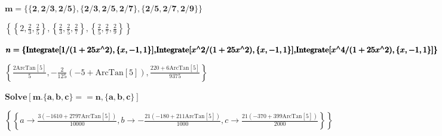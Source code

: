 \documentclass{article}
\begin{document}
\begin{doublespace}
\noindent\(\pmb{\text{}}\)
\end{doublespace}

\begin{doublespace}
\noindent\(\pmb{m=\{\{2,2/3,2/5\},\{2/3,2/5,2/7\},\{2/5,2/7,2/9\}\}}\)
\end{doublespace}

\begin{doublespace}
\noindent\(\left\{\left\{2,\frac{2}{3},\frac{2}{5}\right\},\left\{\frac{2}{3},\frac{2}{5},\frac{2}{7}\right\},\left\{\frac{2}{5},\frac{2}{7},\frac{2}{9}\right\}\right\}\)
\end{doublespace}

\begin{doublespace}
\noindent\(\pmb{n=\{\text{Integrate}[1/(1+25 x{}^{\wedge}2),\{x,-1,1\}],}\\
\pmb{\text{Integrate}[x{}^{\wedge}2/(1+25 x{}^{\wedge}2),\{x,-1,1\}],}\\
\pmb{\text{Integrate}[x{}^{\wedge}4/(1+25 x{}^{\wedge}2),\{x,-1,1\}]\}}\)
\end{doublespace}

\begin{doublespace}
\noindent\(\left\{\frac{2 \text{ArcTan}[5]}{5},-\frac{2}{125} (-5+\text{ArcTan}[5]),\frac{220+6 \text{ArcTan}[5]}{9375}\right\}\)
\end{doublespace}

\begin{doublespace}
\noindent\(\pmb{\text{Solve}[m.\{a,b,c\}==n,\{a,b,c\}]}\)
\end{doublespace}

\begin{doublespace}
\noindent\(\left\{\left\{a\to \frac{3 (-1610+2797 \text{ArcTan}[5])}{10000},b\to -\frac{21 (-180+211 \text{ArcTan}[5])}{1000},c\to \frac{21 (-370+399
\text{ArcTan}[5])}{2000}\right\}\right\}\)
\end{doublespace}
\end{document}
